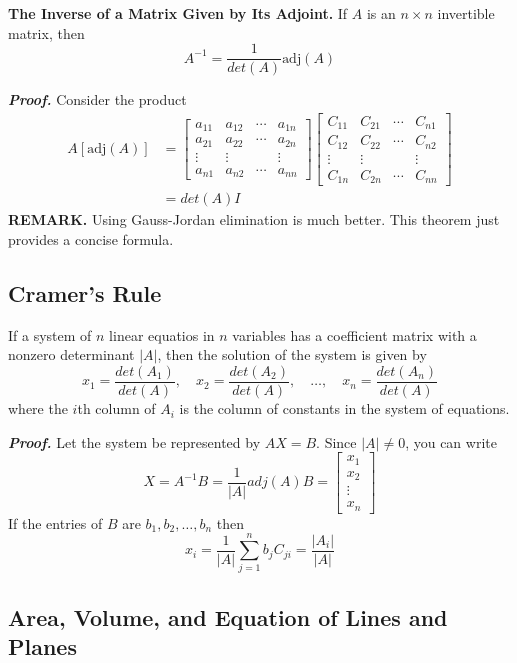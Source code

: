 \documentclass{article}
\newcommand\B{\textbf}
\newcommand\tcl{\begin{tcolorbox}[colback = {blue9}]}
\newcommand\etcl{\end{tcolorbox}}
\newcommand\x{\times}
\begin{document}
    \begin{tcolorbox}[colback = {blue9}]
        \B{The Inverse of a Matrix Given by Its Adjoint.}
        If $A$ is an $n \x n$ invertible matrix, then
        \[ A^{-1} = \frac{1}{det(A)} \text{adj}(A) \]
    \end{tcolorbox}
    \textbf{\textit{Proof.}} Consider the product
    \begin{equation*} 
        \begin{split} 
            A[\text{adj}(A)] & = \begin{bmatrix}
        a_{11} & a_{12} & \cdots & a_{1n    } \\
        a_{21} & a_{22} & \cdots & a_{2n} \\
        \vdots & \vdots & & \vdots \\
        a_{n1} & a_{n2} & \cdots & a_{nn}
    \end{bmatrix} \begin{bmatrix}
        C_{11} & C_{21} & \cdots & C_{n1} \\
        C_{12} & C_{22} & \cdots & C_{n2} \\
        \vdots & \vdots & &  \vdots \\
        C_{1n}  & C_{2n} & \cdots & C_{nn}
    \end{bmatrix} \\
        & = det(A)I
            \end{split} 
        \end{equation*}
    \B{REMARK. } Using Gauss-Jordan elimination is much better. This theorem just provides a concise formula.

    \subsection{Cramer's Rule}
    \tcl
    If a system of $n$ linear equatios in $n$ variables has a coefficient matrix with a nonzero determinant
    $|A|$, then the solution of the system is given by
    \[ x_1 = \frac{det(A_1)}{det(A)}, \quad x_2 = \frac{det(A_2)}{det(A)}, \quad \dots, \quad x_n = \frac{det(A_n)}{det(A)}\]
    where the $i$th column of $A_i$ is the column of constants in the system of equations.
    \etcl
    \B{\textit{Proof.}} Let the system be represented by $AX = B$. Since $|A| \ne 0$, you can write
    \[ X = A^{-1}B = \frac{1}{|A|} adj(A)B = \begin{bmatrix}
        x_1 \\ x_2 \\ \vdots \\ x_n
    \end{bmatrix} \]
    If the entries of $B$ are $b_1, b_2, \dots, b_n$ then
    \[ x_i = \frac{1}{|A|} \sum_{j = 1}^n b_jC_{ji} = \frac{|A_i|}{|A|}\]

    \subsection{Area, Volume, and Equation of Lines and Planes}
\end{document}
